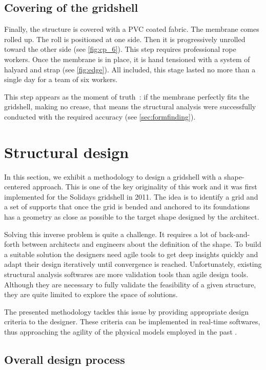 \subsection{Covering of the gridshell}
Finally, the structure is covered with a PVC coated fabric. The membrane comes rolled up. The roll is positioned at one side. Then it is progressively unrolled toward the other side (see \cref{fig:cp_6}). This step requires professional rope workers. Once the membrane is in place, it is hand tensioned with a system of halyard and strap (see \cref{fig:edge}). All included, this stage lasted no more than a single day for a team of six workers.

This step appears as the moment of truth~: if the membrane perfectly fits the gridshell, making no crease, that means the structural analysis were successfully conducted with the required accuracy (see \cref{sec:formfinding}).

\section{Structural design}

In this section, we exhibit a methodology to design a gridshell with a shape-centered approach. This is one of the key originality of this work and it was first implemented for the Solidays gridshell in 2011. The idea is to identify a grid and a set of supports that once the grid is bended and anchored to its foundations has a geometry as close as possible to the target shape designed by the architect.

Solving this inverse problem is quite a challenge. It requires a lot of back-and-forth between architects and engineers about the definition of the shape. To build a suitable solution the designers need agile tools to get deep insights quickly and adapt their design iteratively until convergence is reached. Unfortunately, existing structural analysis softwares are more validation tools than agile design tools. Although they are necessary to fully validate the feasibility of a given structure, they are quite limited to explore the space of solutions.

The presented methodology tackles this issue by providing appropriate design criteria to the designer. These criteria can be implemented in real-time softwares, thus approaching the agility of the physical models employed in the past \cite{Addis2013}.

\subsection{Overall design process}

